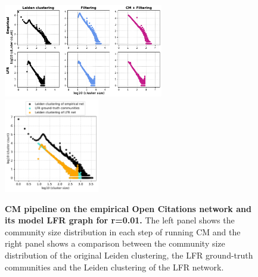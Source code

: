 \documentclass[a4paper]{article}   	%
\begin{document}
\begin{figure}[h!]
\centering
\includegraphics[width=0.62\textwidth]{figs/oc_cm_steps_lfr01.pdf}
\includegraphics[width=0.37\textwidth]{figs/oc_01_cm_size.pdf}
\caption[CM pipeline on the empirical Open Citations network and its model LFR graph for r=0.01]{\textbf{CM pipeline on the empirical Open Citations network and its model LFR graph for r=0.01.} The left panel shows the community size distribution in each step of running CM and the right panel shows a comparison between the community size distribution of the original Leiden clustering, the LFR ground-truth communities and the Leiden clustering of the LFR network.}
\label{fig:oc-cm-lfr-01}
\end{figure}
\end{document}
